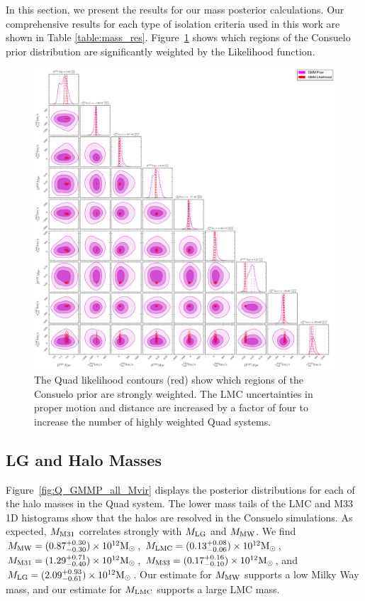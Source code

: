 \documentclass[iop,apj,twocolappendix,numberedappendix]{emulateapj}
\newcommand{\MLMC}{M_{\rm LMC}}
\newcommand{\MMW}{{\rm M}_{\rm MW}}
\newcommand{\Msun}{{\rm M}_\odot}
\newcommand{\consuelo}{{\sc Consuelo }}
\def\Fref#1{Figure~\ref{#1}}
\def\MLG{M_{\rm LG}}
\def\MMW{M_{\rm MW}}
\def\MEI{M_{\rm M31}}
\def\MEE{M_{\rm M33}}
\def\MMWestimate{0.87}
\def\MMWerrorplus{0.30}
\def\MMWerrorminus{0.30}
\def\MEIestimate{1.29}
\def\MEIerrorplus{0.71}
\def\MEIerrorminus{0.40}
\def\MEEestimate{0.17}
\def\MEEerrorplus{0.16}
\def\MEEerrorminus{0.10}
\def\MLMCestimate{0.13}
\def\MLMCerrorplus{0.08}
\def\MLMCerrorminus{0.06}
\def\MLGestimate{2.09}
\def\MLGerrorplus{0.93}
\def\MLGerrorminus{0.61}
\begin{document}
In this section, we present the results for our mass posterior calculations. Our comprehensive results for each type of isolation criteria used in this work are shown in Table \ref{table:mass_res}. 
\Fref{fig:LvsPGMM} shows which regions of the \consuelo prior distribution are significantly weighted by the Likelihood function.

\begin{figure}
\includegraphics[width=\linewidth]{figures/LvsPGMM.pdf}
\caption{The Quad likelihood contours (red) show which regions of the \consuelo prior are strongly weighted. The LMC uncertainties in proper motion and distance are increased by a factor of four to increase the number of highly weighted Quad systems.}
\label{fig:LvsPGMM}
\end{figure}






\subsection{LG and Halo Masses}
\label{sec:nums}
\Fref{fig:Q_GMMP_all_Mvir} displays the posterior distributions for each of the halo masses in the Quad system. 
The lower mass tails of the LMC and M33 1D histograms show that the halos are resolved in the \consuelo simulations. 
As expected, $\MEI$ correlates strongly with $\MLG$ and $\MMW$.
We find $\MMW = (\MMWestimate^{+\MMWerrorplus}_{-\MMWerrorminus}) \times 10^{12}
\Msun$, $\MLMC = (\MLMCestimate^{+\MLMCerrorplus}_{-\MLMCerrorminus}) \times 10^{12}
\Msun$, $\MEI =
(\MEIestimate^{+\MEIerrorplus}_{-\MEIerrorminus}) \times 10^{12} \Msun$, $\MEE
= (\MEEestimate^{+\MEEerrorplus}_{-\MEEerrorminus}) \times 10^{12} \Msun$, 
and $\MLG = (\MLGestimate^{+\MLGerrorplus}_{-\MLGerrorminus}) \times 10^{12}
\Msun$.
Our estimate for $\MMW$ supports a low Milky Way mass, and our estimate for $\MLMC$ supports a large LMC mass. 
\end{document}
